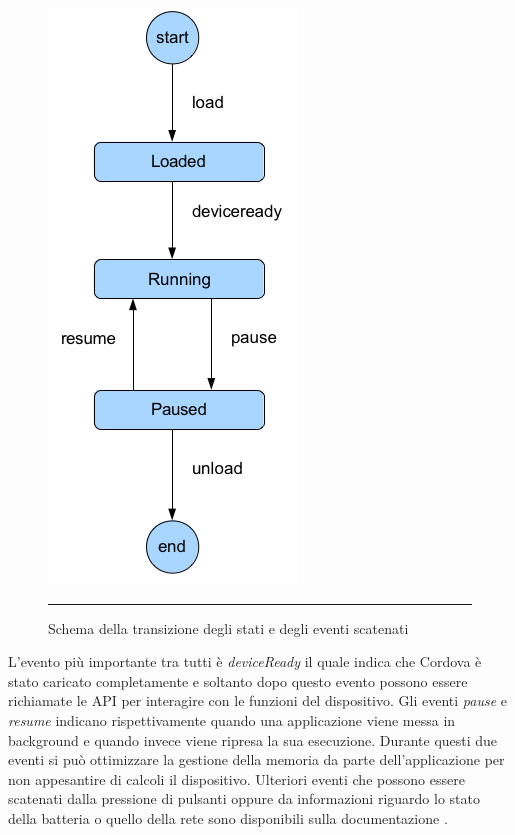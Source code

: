 \begin{figure}[htbp]
  \centering
    \includegraphics[scale=0.6]{Figures/cordova_application_states.png}  
    \rule{35em}{0.5pt}
  \caption[Stati di una applicazione]{Schema della transizione degli stati e degli eventi scatenati}
  \label{fig:cordova_app_states}
\end{figure}

L'evento più importante tra tutti è \emph{deviceReady} il quale indica che Cordova è stato caricato completamente e soltanto dopo questo evento possono essere richiamate le API per interagire con le funzioni del dispositivo. Gli eventi \emph{pause} e \emph{resume} indicano rispettivamente quando una applicazione viene messa in background e quando invece viene ripresa la sua esecuzione. Durante questi due eventi si può ottimizzare la gestione della memoria da parte dell'applicazione per non appesantire di calcoli il dispositivo. Ulteriori eventi che possono essere scatenati dalla pressione di pulsanti oppure da informazioni riguardo lo stato della batteria o quello della rete sono disponibili sulla documentazione \citep{web:phonegap_events}.


